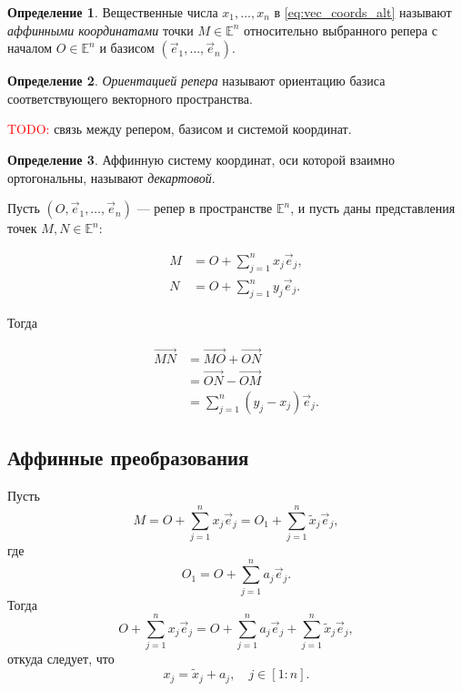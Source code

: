 \documentclass{article}
\theoremstyle{definition}
\newtheorem{definition}{Определение}[section]
\theoremstyle{plain}
\theoremstyle{remark}
\numberwithin{equation}{section}
\newcommand{\vv}[1]{\overrightarrow{#1}}
\begin{document}
\begin{definition}
  Вещественные числа $x_1, \dots, x_n$ в \ref{eq:vec_coords_alt} называют
  \textit{аффинными координатами} точки $M \in \mathbb{E}^n$ относительно
  выбранного репера с началом $O \in \mathbb{E}^n$ и базисом
  $(\vec{e}_1, \dots, \vec{e}_n)$.
\end{definition}

\begin{definition}
  \textit{Ориентацией репера} называют ориентацию базиса соответствующего
  векторного пространства.
\end{definition}

\textcolor{red}{TODO:} связь между репером, базисом и системой координат.

\begin{definition}
  Аффинную систему координат, оси которой взаимно ортогональны, называют
  \textit{декартовой}.
\end{definition}

Пусть $(O, \vec{e}_1, \dots, \vec{e}_n)$ --- репер в пространстве
$\mathbb{E}^n$, и пусть даны представления точек $M,N \in \mathbb{E}^n$:

\begin{equation}
  \begin{aligned}
    M &= O + \sum_{j=1}^n x_j \vec{e}_j, \\
    N &= O + \sum_{j=1}^n y_j \vec{e}_j.
  \end{aligned}
\end{equation}

Тогда

\begin{equation}
  \begin{aligned}
    \vv{MN} &= \vv{MO} + \vv{ON} \\
    &= \vv{ON} - \vv{OM} \\
    &= \sum_{j=1}^n (y_j - x_j) \vec{e}_j.
  \end{aligned}
\end{equation}

\subsection{Аффинные преобразования}

Пусть
\begin{equation}
  M = O + \sum_{j=1}^n x_j \vec{e}_j = O_1 + \sum_{j=1}^n \tilde{x}_j \vec{e}_j,
\end{equation}
где
\begin{equation}
  O_1 = O + \sum_{j=1}^n a_j \vec{e}_j.
\end{equation}
Тогда
\begin{equation*}
  O + \sum_{j=1}^n x_j \vec{e}_j = O + \sum_{j=1}^n a_j \vec{e}_j +
    \sum_{j=1}^n \tilde{x}_j \vec{e}_j,
\end{equation*}
откуда следует, что
\begin{equation}
  x_j = \tilde{x}_j + a_j, \quad j \in [1:n].
\end{equation}
\end{document}
